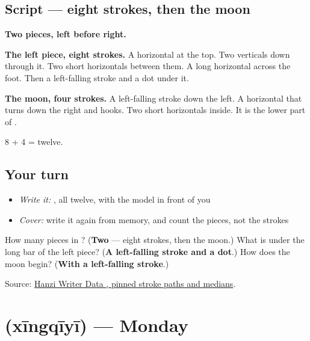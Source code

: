 \subsection*{Script — eight strokes, then the moon}

\begin{quote}
\end{quote}

\textbf{Two pieces, left before right.}

\textbf{The left piece, eight strokes.} A horizontal at the top. Two verticals down through it. Two short horizontals between them. A long horizontal across the foot. Then a left-falling stroke and a dot under it.

\textbf{The moon, four strokes.} A left-falling stroke down the left. A horizontal that turns down the right and hooks. Two short horizontals inside. It is the lower part of .

8 + 4 = twelve.

\subsection*{Your turn}
\begin{itemize}
\raggedright
  \item \emph{Write it:} , all twelve, with the model in front of you
  \item \emph{Cover:} write it again from memory, and count the pieces, not the strokes
\end{itemize}

\begin{tcolorbox}[breakable,colback=teal!4,colframe=teal!35!black,title={Before you move on}]
How many pieces in ? (\textbf{Two} — eight strokes, then the moon.) What is under the long bar of the left piece? (\textbf{A left-falling stroke and a dot}.) How does the moon begin? (\textbf{With a left-falling stroke}.)

Source: \href{https://raw.githubusercontent.com/chanind/hanzi-writer-data/68d10a4b21150cae5e1ebbd223eed289cf32d90c/data/\%E6\%9C\%9F.json}{Hanzi Writer Data , pinned stroke paths and medians}.
\end{tcolorbox}
\section[\texorpdfstring{\zh{星期一} (xīngqīyī)}{星期一 (xīngqīyī)}]{ (xīngqīyī) — Monday}

